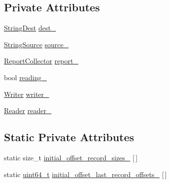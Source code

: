 \subsection*{Private Attributes}
\begin{DoxyCompactItemize}
\item 
\hyperlink{classleveldb_1_1log_1_1_log_test_1_1_string_dest}{String\-Dest} \hyperlink{classleveldb_1_1log_1_1_log_test_a411c42600e9ef78eb22577dcce8ffb70}{dest\-\_\-}
\item 
\hyperlink{classleveldb_1_1log_1_1_log_test_1_1_string_source}{String\-Source} \hyperlink{classleveldb_1_1log_1_1_log_test_a6b1751fd9e549d4bce02afbeca392058}{source\-\_\-}
\item 
\hyperlink{classleveldb_1_1log_1_1_log_test_1_1_report_collector}{Report\-Collector} \hyperlink{classleveldb_1_1log_1_1_log_test_a39e97d85a7494c9b8056c10e1124e374}{report\-\_\-}
\item 
bool \hyperlink{classleveldb_1_1log_1_1_log_test_a9aa3611d063dee048f778dd10aab37ba}{reading\-\_\-}
\item 
\hyperlink{classleveldb_1_1log_1_1_writer}{Writer} \hyperlink{classleveldb_1_1log_1_1_log_test_a8b219478ee3bf6a34802c4ebca6fae6d}{writer\-\_\-}
\item 
\hyperlink{classleveldb_1_1log_1_1_reader}{Reader} \hyperlink{classleveldb_1_1log_1_1_log_test_a7011f0308081ffe914c3b131948f06f5}{reader\-\_\-}
\end{DoxyCompactItemize}
\subsection*{Static Private Attributes}
\begin{DoxyCompactItemize}
\item 
static size\-\_\-t \hyperlink{classleveldb_1_1log_1_1_log_test_a1c32fd131248b038f38d320558a6c211}{initial\-\_\-offset\-\_\-record\-\_\-sizes\-\_\-} \mbox{[}$\,$\mbox{]}
\item 
static \hyperlink{stdint_8h_aaa5d1cd013383c889537491c3cfd9aad}{uint64\-\_\-t} \hyperlink{classleveldb_1_1log_1_1_log_test_a291ccfe6639347ff67b6039974151b0d}{initial\-\_\-offset\-\_\-last\-\_\-record\-\_\-offsets\-\_\-} \mbox{[}$\,$\mbox{]}
\end{DoxyCompactItemize}


